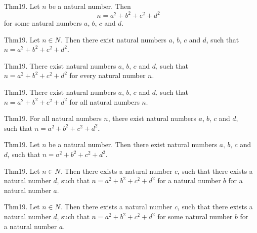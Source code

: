 \documentclass{article}
\begin{document}
Thm19. Let $n$ be a natural number. Then $$n = a ^{ 2}+ b ^{ 2}+ c ^{ 2}+ d ^{ 2}$$ for some natural numbers $a$, $b$, $c$ and $d$.

Thm19. Let $n \in N$. Then there exist natural numbers $a$, $b$, $c$ and $d$, such that $n = a ^{ 2}+ b ^{ 2}+ c ^{ 2}+ d ^{ 2}$.

Thm19. There exist natural numbers $a$, $b$, $c$ and $d$, such that $n = a ^{ 2}+ b ^{ 2}+ c ^{ 2}+ d ^{ 2}$ for every natural number $n$.

Thm19. There exist natural numbers $a$, $b$, $c$ and $d$, such that $n = a ^{ 2}+ b ^{ 2}+ c ^{ 2}+ d ^{ 2}$ for all natural numbers $n$.

Thm19. For all natural numbers $n$, there exist natural numbers $a$, $b$, $c$ and $d$, such that $n = a ^{ 2}+ b ^{ 2}+ c ^{ 2}+ d ^{ 2}$.

Thm19. Let $n$ be a natural number. Then there exist natural numbers $a$, $b$, $c$ and $d$, such that $n = a ^{ 2}+ b ^{ 2}+ c ^{ 2}+ d ^{ 2}$.

Thm19. Let $n \in N$. Then there exists a natural number $c$, such that there exists a natural number $d$, such that $n = a ^{ 2}+ b ^{ 2}+ c ^{ 2}+ d ^{ 2}$ for a natural number $b$ for a natural number $a$.

Thm19. Let $n \in N$. Then there exists a natural number $c$, such that there exists a natural number $d$, such that $n = a ^{ 2}+ b ^{ 2}+ c ^{ 2}+ d ^{ 2}$ for some natural number $b$ for a natural number $a$.
\end{document}
